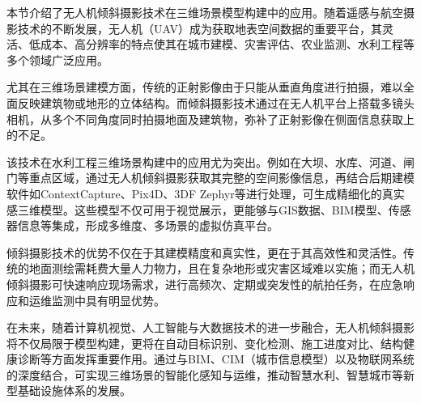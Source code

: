 本节介绍了无人机倾斜摄影技术在三维场景模型构建中的应用。随着遥感与航空摄影技术的不断发展，无人机（UAV）成为获取地表空间数据的重要平台，其灵活、低成本、高分辨率的特点使其在城市建模、灾害评估、农业监测、水利工程等多个领域广泛应用。

尤其在三维场景建模方面，传统的正射影像由于只能从垂直角度进行拍摄，难以全面反映建筑物或地形的立体结构。而倾斜摄影技术通过在无人机平台上搭载多镜头相机，从多个不同角度同时拍摄地面及建筑物，弥补了正射影像在侧面信息获取上的不足。

该技术在水利工程三维场景构建中的应用尤为突出。例如在大坝、水库、河道、闸门等重点区域，通过无人机倾斜摄影获取其完整的空间影像信息，再结合后期建模软件如ContextCapture、Pix4D、3DF
Zephyr等进行处理，可生成精细化的真实感三维模型。这些模型不仅可用于视觉展示，更能够与GIS数据、BIM模型、传感器信息等集成，形成多维度、多场景的虚拟仿真平台。

倾斜摄影技术的优势不仅在于其建模精度和真实性，更在于其高效性和灵活性。传统的地面测绘需耗费大量人力物力，且在复杂地形或灾害区域难以实施；而无人机倾斜摄影可快速响应现场需求，进行高频次、定期或突发性的航拍任务，在应急响应和运维监测中具有明显优势。

在未来，随着计算机视觉、人工智能与大数据技术的进一步融合，无人机倾斜摄影将不仅局限于模型构建，更将在自动目标识别、变化检测、施工进度对比、结构健康诊断等方面发挥重要作用。通过与BIM、CIM（城市信息模型）以及物联网系统的深度结合，可实现三维场景的智能化感知与运维，推动智慧水利、智慧城市等新型基础设施体系的发展。
